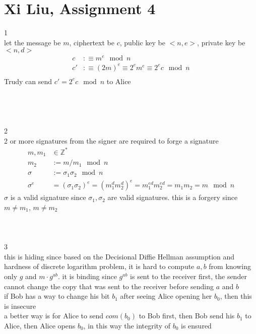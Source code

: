 \documentclass[12pt,border=4pt,multi]{article} %
\begin{document}
\section*{Xi Liu, Assignment 4}
1\\
let the message be $m$, ciphertext be $c$, public key be $<n, e>$, private key be $<n, d>$
\begin{align*}
c &:\equiv m^e \mod n\\
c' &:\equiv (2m)^e \equiv 2^e m^e \equiv 2^e c \mod n\\
\end{align*}
Trudy can send $c' = 2^e c \mod n$ to Alice\\
\\
\\
\\
\\
2\\
2 or more signatures from the signer are required to forge a signature
\begin{align*}
m, m_1 &\in \mathbb{Z^*}\\
m_2 &:= m / m_1 \mod n\\
\sigma &:= \sigma_1 \sigma_2 \mod n\\
\sigma^e &= (\sigma_1 \sigma_2)^e = (m_1^d m_2^d)^e = m_1^{ed} m_2^{ed} = m_1 m_2 = m \mod n
\end{align*}
$\sigma$ is a valid signature since $\sigma_1, \sigma_2$ are valid signatures. this is a forgery since $m \not= m_1$, $m \not= m_2$
\\
\\
\\
\\
3\\
this is hiding since based on the Decisional Diffie Hellman assumption and hardness of discrete logarithm problem, it is hard to compute $a, b$ from knowing only $g$ and $m \cdot g^{ab}$. it is binding since $g^{ab}$ is sent to the receiver first, the sender cannot change the copy that was sent to the receiver before sending $a$ and $b$
\newpage
{}\\
if Bob has a way to change his bit $b_1$ after seeing Alice opening her $b_0$, then this is insecure\\
a better way is for Alice to send $com(b_0)$ to Bob first, then Bob send his $b_1$ to Alice, then Alice opens $b_0$, in this way the integrity of $b_0$ is ensured
\end{document}
